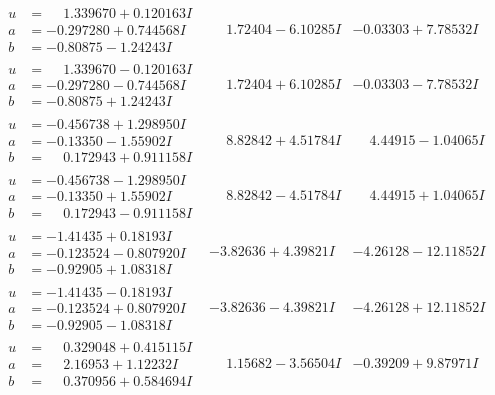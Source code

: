 \documentclass[1p]{elsarticle_modified}
\theoremstyle{definition}
\begin{document}
$$\begin{array}{c|c|c}
\begin{aligned}
u &= \phantom{-}1.339670 + 0.120163 I \\
a &= -0.297280 + 0.744568 I \\
b &= -0.80875 - 1.24243 I\end{aligned}
 & \phantom{-}1.72404 - 6.10285 I & -0.03303 + 7.78532 I \\ \hline\begin{aligned}
u &= \phantom{-}1.339670 - 0.120163 I \\
a &= -0.297280 - 0.744568 I \\
b &= -0.80875 + 1.24243 I\end{aligned}
 & \phantom{-}1.72404 + 6.10285 I & -0.03303 - 7.78532 I \\ \hline\begin{aligned}
u &= -0.456738 + 1.298950 I \\
a &= -0.13350 - 1.55902 I \\
b &= \phantom{-}0.172943 + 0.911158 I\end{aligned}
 & \phantom{-}8.82842 + 4.51784 I & \phantom{-}4.44915 - 1.04065 I \\ \hline\begin{aligned}
u &= -0.456738 - 1.298950 I \\
a &= -0.13350 + 1.55902 I \\
b &= \phantom{-}0.172943 - 0.911158 I\end{aligned}
 & \phantom{-}8.82842 - 4.51784 I & \phantom{-}4.44915 + 1.04065 I \\ \hline\begin{aligned}
u &= -1.41435 + 0.18193 I \\
a &= -0.123524 - 0.807920 I \\
b &= -0.92905 + 1.08318 I\end{aligned}
 & -3.82636 + 4.39821 I & -4.26128 - 12.11852 I \\ \hline\begin{aligned}
u &= -1.41435 - 0.18193 I \\
a &= -0.123524 + 0.807920 I \\
b &= -0.92905 - 1.08318 I\end{aligned}
 & -3.82636 - 4.39821 I & -4.26128 + 12.11852 I \\ \hline\begin{aligned}
u &= \phantom{-}0.329048 + 0.415115 I \\
a &= \phantom{-}2.16953 + 1.12232 I \\
b &= \phantom{-}0.370956 + 0.584694 I\end{aligned}
 & \phantom{-}1.15682 - 3.56504 I & -0.39209 + 9.87971 I \\ \hline\begin{aligned}

\end{aligned}
\end{array}$$
\end{document}
